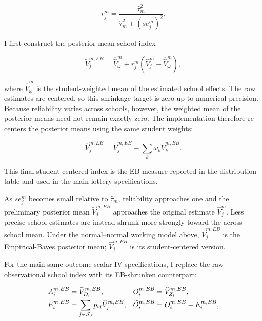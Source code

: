 \documentclass[a4paper, article, english, oneside, unknownkeysallowed, 12pt]{memoir}
\begin{document}
\begin{equation}
    r_j^m
    =
    \frac{\widehat{\tau}_m^2}
    {\widehat{\tau}_m^2+(se_j^m)^2}.
    \label{eq:eb-reliability}
\end{equation}

I first construct the posterior-mean school index

\begin{equation}
    \widetilde V_j^{m,EB}
    =
    \overline{\widehat V}_{\omega}^m
    +
    r_j^m
    \left(
        \widehat V_j^m
        -
        \overline{\widehat V}_{\omega}^m
    \right),
\end{equation}

where $\overline{\widehat V}_{\omega}^m$ is the student-weighted mean of the estimated
school effects. The raw estimates are centered, so this shrinkage target is zero up to
numerical precision. Because reliability varies across schools, however, the weighted
mean of the posterior means need not remain exactly zero. The implementation therefore
re-centers the posterior means using the same student weights:

\begin{equation}
    \widehat V_j^{m,EB}
    =
    \widetilde V_j^{m,EB}
    -
    \sum_k \omega_k\widetilde V_k^{m,EB}.
    \label{eq:eb-va}
\end{equation}

This final student-centered index is the EB measure reported in the distribution table
and used in the main lottery specifications.

As $se_j^m$ becomes small relative to $\widehat\tau_m$, reliability approaches one and
the preliminary posterior mean $\widetilde V_j^{m,EB}$ approaches the original estimate
$\widehat V_j^m$. Less precise school estimates are instead shrunk more strongly toward
the across-school mean. Under the normal--normal working model above,
$\widetilde V_j^{m,EB}$ is the Empirical-Bayes posterior mean;
$\widehat V_j^{m,EB}$ is its student-centered version.

For the main same-outcome scalar IV specifications, I replace the raw observational
school index with its EB-shrunken counterpart:

\begin{align}
    A_i^{m,EB}
    &=
    \widehat V_{D_i}^{m,EB},
    &
    O_i^{m,EB}
    &=
    \widehat V_{Z_i}^{m,EB},
    \notag\\
    E_i^{m,EB}
    &=
    \sum_{j\in\mathcal J_0}p_{ij}\widehat V_j^{m,EB},
    &
    \widetilde O_i^{m,EB}
    &=
    O_i^{m,EB}-E_i^{m,EB},
    \label{eq:eb-iv-objects}
\end{align}
\end{document}
